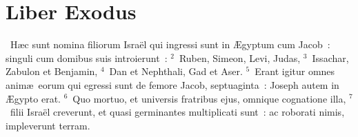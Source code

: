 \clearpage
{\centering \section*{Liber Exodus}}\thispagestyle{empty}

~H\ae c sunt nomina filiorum Isra\"el qui ingressi sunt in \AE gyptum cum Jacob~: singuli cum domibus suis introierunt~:
${}^{2}$~Ruben, Simeon, Levi, Judas,
${}^{3}$~Issachar, Zabulon et Benjamin,
${}^{4}$~Dan et Nephthali, Gad et Aser.
${}^{5}$~Erant igitur omnes anim\ae\ eorum qui egressi sunt de femore Jacob, septuaginta~: Joseph autem in \AE gypto erat.
${}^{6}$~Quo mortuo, et universis fratribus ejus, omnique cognatione illa,
${}^{7}$~filii Isra\"el creverunt, et quasi germinantes multiplicati sunt~: ac roborati nimis, impleverunt terram.


